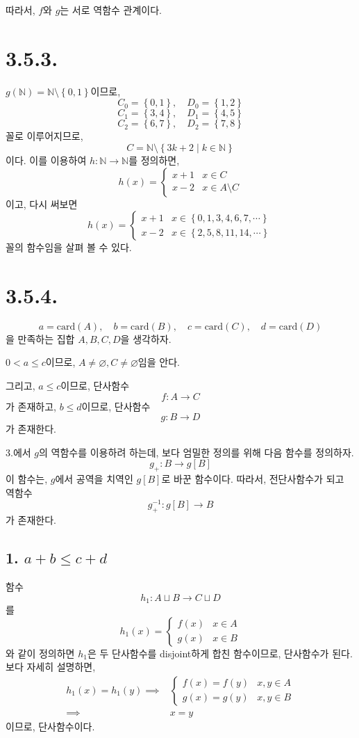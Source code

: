\documentclass{article}
\begin{document}
따라서, $f$와 $g$는 서로 역함수 관계이다.

\section{3.5.3.}
$g(\mathbb{N}) = \mathbb{N} \setminus \left\{0, 1\right\}$이므로,
$$C_0 = \left\{0, 1\right\}, \quad D_0 = \left\{1, 2\right\}$$
$$C_1 = \left\{3, 4\right\}, \quad D_1 = \left\{4, 5\right\}$$
$$C_2 = \left\{6, 7\right\}, \quad D_2 = \left\{7, 8\right\}$$
꼴로 이루어지므로,
$$C = \mathbb{N} \setminus \left\{3k + 2 \mid k \in \mathbb{N} \right\}$$
이다. 이를 이용하여 $h : \mathbb{N} \rightarrow \mathbb{N}$를 정의하면,
$$
h(x) = \left\{\begin{matrix}
x+1 & x \in C
\\ x-2 & x \in A\setminus C
\end{matrix}\right.
$$이고, 다시 써보면
$$
h(x) = \left\{\begin{matrix}
x+1 & x \in \left\{0, 1, 3, 4, 6, 7, \cdots \right\}
\\ x-2 & x \in \left\{2, 5, 8, 11, 14, \cdots \right\}
\end{matrix}\right.
$$ 꼴의 함수임을 살펴 볼 수 있다.

\section{3.5.4.}
$$a = \text{card}(A), \quad b = \text{card}(B), \quad c = \text{card}(C), \quad d = \text{card}(D)$$
을 만족하는 집합 $A, B, C, D$을 생각하자.

$0 < a \le c$이므로, $A \neq \varnothing, C \neq \varnothing$임을 안다.

그리고, $a \le c$이므로, 단사함수 $$f : A \rightarrow C$$가 존재하고,
$b \le d$이므로, 단사함수 $$g : B \rightarrow D$$가 존재한다.

3.에서 $g$의 역함수를 이용하려 하는데, 보다 엄밀한 정의를 위해 다음 함수를 정의하자.
$$g_+ : B \rightarrow g[B]$$
이 함수는, $g$에서 공역을 치역인 $g[B]$로 바꾼 함수이다. 따라서, 전단사함수가 되고 역함수
$$g_+^{-1} : g[B] \rightarrow B$$가 존재한다.

\subsection{1. $a+b \le c+d$}
함수
$$h_1 : A \sqcup B \rightarrow C \sqcup D$$
를
$$
h_1(x) = \left\{ 
\begin{matrix}
f(x) & x \in A
\\g(x) & x \in B
\end{matrix}
\right.
$$
와 같이 정의하면 $h_1$은 두 단사함수를 disjoint하게 합친 함수이므로, 단사함수가 된다. 보다 자세히 설명하면,
\begin{align*}
h_1(x) = h_1(y) \implies &
\left\{
\begin{matrix}
f(x) = f(y) & x, y \in A
\\ g(x) = g(y) & x, y \in B
\end{matrix}
\right.
\\ \implies & x = y
\end{align*}이므로, 단사함수이다.
\end{document}
